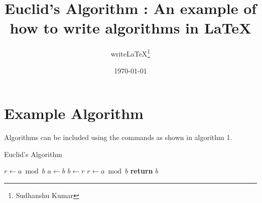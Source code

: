 \documentclass[12pt, letterpaper]{article}
\title{Euclid's Algorithm : An example of how to write algorithms in \LaTeX{}}
\author{write\LaTeX{}\thanks{Sudhanshu Kumar}}
\date{\today}
\begin{document}
\maketitle
\section{Example Algorithm}
Algorithms can be included using the commands as shown in algorithm 1.
\begin{algorithm}
\caption{Euclid's Algorithm}
\begin{algorithmic}[1]
 
\State $r \gets a \bmod b$
 
\State $a \gets b$
\State $b \gets r$
\State $r \gets a \bmod b$
\EndWhile
\State \textbf{return} $b$ 
\EndProcedure
\end{algorithmic}
\end{algorithm}
\end{document}
